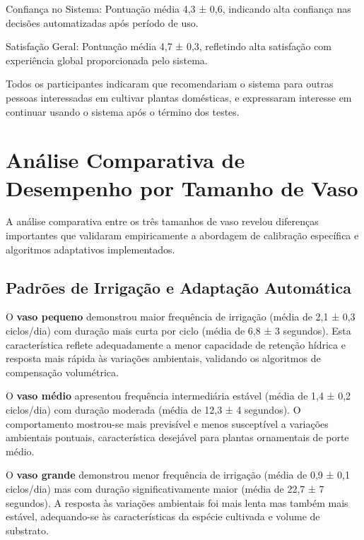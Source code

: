 Confiança no Sistema: Pontuação média 4,3 ± 0,6, indicando alta confiança nas decisões automatizadas após período de uso.

Satisfação Geral: Pontuação média 4,7 ± 0,3, refletindo alta satisfação com experiência global proporcionada pelo sistema.

Todos os participantes indicaram que recomendariam o sistema para outras pessoas interessadas em cultivar plantas domésticas, e expressaram interesse em continuar usando o sistema após o término dos testes.

\section{Análise Comparativa de Desempenho por Tamanho de Vaso}

A análise comparativa entre os três tamanhos de vaso revelou diferenças importantes que validaram empiricamente a abordagem de calibração específica e algoritmos adaptativos implementados.

\subsection{Padrões de Irrigação e Adaptação Automática}

O \textbf{vaso pequeno} demonstrou maior frequência de irrigação (média de 2,1 ± 0,3 ciclos/dia) com duração mais curta por ciclo (média de 6,8 ± 3 segundos). Esta característica reflete adequadamente a menor capacidade de retenção hídrica e resposta mais rápida às variações ambientais, validando os algoritmos de compensação volumétrica.

O \textbf{vaso médio} apresentou frequência intermediária estável (média de 1,4 ± 0,2 ciclos/dia) com duração moderada (média de 12,3 ± 4 segundos). O comportamento mostrou-se mais previsível e menos susceptível a variações ambientais pontuais, característica desejável para plantas ornamentais de porte médio.

O \textbf{vaso grande} demonstrou menor frequência de irrigação (média de 0,9 ± 0,1 ciclos/dia) mas com duração significativamente maior (média de 22,7 ± 7 segundos). A resposta às variações ambientais foi mais lenta mas também mais estável, adequando-se às características da espécie cultivada e volume de substrato.

